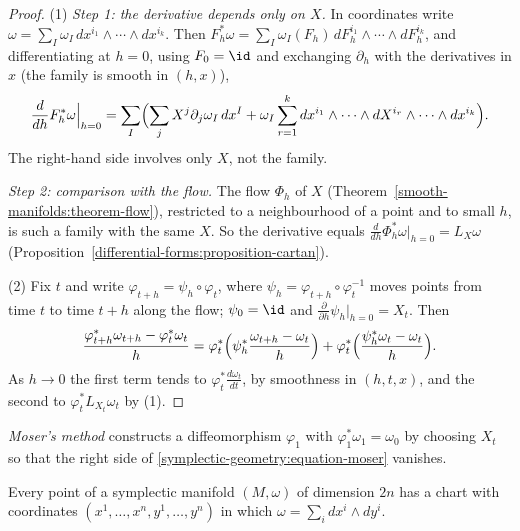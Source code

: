 \begin{proof}
(1) \emph{Step 1: the derivative depends only on $X$.} In coordinates write $\omega = \sum_I\omega_I\,dx^{i_1} \wedge \cdots \wedge dx^{i_k}$. Then
$F_h^*\omega = \sum_I\omega_I(F_h)\,dF_h^{i_1} \wedge \cdots \wedge dF_h^{i_k}$, and differentiating at $h = 0$, using $F_0 = \id$ and exchanging $\partial_h$ with the derivatives in $x$ (the family is smooth in
$(h, x)$),
\[
\frac{d}{dh}F_h^*\omega\Big|_{h=0} = \sum_I\Bigl(\sum_jX^j\partial_j\omega_I\,dx^I + \omega_I\sum_{r=1}^kdx^{i_1} \wedge \cdots \wedge dX^{i_r} \wedge \cdots \wedge dx^{i_k}\Bigr).
\]
The right-hand side involves only $X$, not the family.

\emph{Step 2: comparison with the flow.} The flow $\Phi_h$ of $X$ (Theorem~\ref{smooth-manifolds:theorem-flow}), restricted to a neighbourhood of a point and to small $h$, is such a family with the same $X$. So the
derivative equals $\frac{d}{dh}\Phi_h^*\omega|_{h=0} = L_X\omega$ (Proposition~\ref{differential-forms:proposition-cartan}).

(2) Fix $t$ and write $\varphi_{t+h} = \psi_h \circ \varphi_t$, where $\psi_h = \varphi_{t+h} \circ \varphi_t^{-1}$ moves points from time $t$ to time $t + h$ along the flow; $\psi_0 = \id$ and
$\frac{\partial}{\partial h}\psi_h|_{h=0} = X_t$. Then
\[
\frac{\varphi_{t+h}^*\omega_{t+h} - \varphi_t^*\omega_t}{h} = \varphi_t^*\Bigl(\psi_h^*\frac{\omega_{t+h} - \omega_t}{h}\Bigr) + \varphi_t^*\Bigl(\frac{\psi_h^*\omega_t - \omega_t}{h}\Bigr).
\]
As $h \to 0$ the first term tends to $\varphi_t^*\frac{d\omega_t}{dt}$, by smoothness in $(h, t, x)$, and the second to $\varphi_t^*L_{X_t}\omega_t$ by (1).
\end{proof}

\emph{Moser's method} constructs a diffeomorphism $\varphi_1$ with $\varphi_1^*\omega_1 = \omega_0$ by choosing $X_t$ so that the right side of \eqref{symplectic-geometry:equation-moser} vanishes.

\begin{theorem}[Darboux]\label{symplectic-geometry:theorem-darboux}
Every point of a symplectic manifold $(M, \omega)$ of dimension $2n$ has a chart with coordinates $(x^1, \ldots, x^n, y^1, \ldots, y^n)$ in which $\omega = \sum_idx^i \wedge dy^i$.
\end{theorem}

